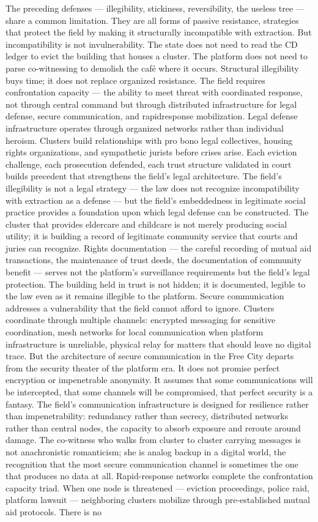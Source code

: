 The preceding defenses — illegibility, stickiness, reversibility, the useless tree — share a common limitation. They are all forms of passive resistance, strategies that protect the field by making it structurally incompatible with extraction. But incompatibility is not invulnerability. The state does not need to read the CD ledger to evict the building that houses a cluster. The platform does not need to parse co-witnessing to demolish the café where it occurs. Structural illegibility buys time; it does not replace organized resistance. The field requires confrontation capacity — the ability to meet threat with coordinated response, not through central command but through distributed infrastructure for legal defense, secure communication, and rapidresponse mobilization. Legal defense infrastructure operates through organized networks rather than individual heroism. Clusters build relationships with pro bono legal collectives, housing rights organizations, and sympathetic jurists before crises arise. Each eviction challenge, each prosecution defended, each trust structure validated in court builds precedent that strengthens the field’s legal architecture. The field’s illegibility is not a legal strategy — the law does not recognize incompatibility with extraction as a defense — but the field’s embeddedness in legitimate social practice provides a foundation upon which legal defense can be constructed. The cluster that provides eldercare and childcare is not merely producing social utility; it is building a record of legitimate community service that courts and juries can recognize. Rights documentation — the careful recording of mutual aid transactions, the maintenance of trust deeds, the documentation of community benefit — serves not the platform’s surveillance requirements but the field’s legal protection. The building held in trust is not hidden; it is documented, legible to the law even as it remains illegible to the platform. Secure communication addresses a vulnerability that the field cannot afford to ignore. Clusters coordinate through multiple channels: encrypted messaging for sensitive coordination, mesh networks for local communication when platform infrastructure is unreliable, physical relay for matters that should leave no digital trace. But the architecture of secure communication in the Free City departs from the security theater of the platform era. It does not promise perfect encryption or impenetrable anonymity. It assumes that some communications will be intercepted, that some channels will be compromised, that perfect security is a fantasy. The field’s communication infrastructure is designed for resilience rather than impenetrability: redundancy rather than secrecy, distributed networks rather than central nodes, the capacity to absorb exposure and reroute around damage. The co-witness who walks from cluster to cluster carrying messages is not anachronistic romanticism; she is analog backup in a digital world, the recognition that the most secure communication channel is sometimes the one that produces no data at all. Rapid-response networks complete the confrontation capacity triad. When one node is threatened — eviction proceedings, police raid, platform lawsuit — neighboring clusters mobilize through pre-established mutual aid protocols. There is no 